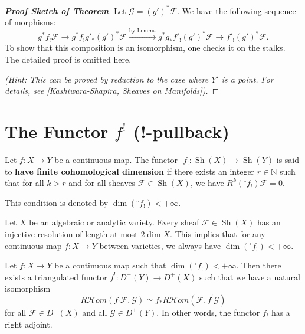 \begin{proof}[\textbf{Proof Sketch of Theorem}]
    Let $\mathcal{G} = (g')^* \mathcal{F}$. We have the following sequence of morphisms:
\begin{equation*}
    g^* f_! \mathcal{F} \longrightarrow g^* f_! g'_* (g')^* \mathcal{F} \xrightarrow{\text{by Lemma}} g^* g_* f'_! (g')^* \mathcal{F} \longrightarrow f'_! (g')^* \mathcal{F}.
\end{equation*}
To show that this composition is an isomorphism, one checks it on the stalks. The detailed proof is omitted here. 

\textit{(Hint: This can be proved by reduction to the case where $Y'$ is a point. For details, see [Kashiwara-Shapira, Sheaves on Manifolds]).}
\end{proof}

\section{The Functor $f^!$ (!-pullback)}

\begin{definition}
Let $f \colon X \to Y$ be a continuous map. The functor $^\circ f_! \colon \operatorname{Sh}(X) \to \operatorname{Sh}(Y)$ is said to \textbf{have finite cohomological dimension} if there exists an integer $r \in \mathbb{N}$ such that for all $k > r$ and for all sheaves $\mathcal{F} \in \operatorname{Sh}(X)$, we have $R^k (^\circ f_!) \mathcal{F} = 0$. 

This condition is denoted by $\dim(^\circ f_!) < +\infty$.
\end{definition}

\begin{example}
Let $X$ be an algebraic or analytic variety. Every sheaf $\mathcal{F} \in \operatorname{Sh}(X)$ has an injective resolution of length at most $2 \dim X$. This implies that for any continuous map $f \colon X \to Y$ between varieties, we always have $\dim(^\circ f_!) < +\infty$.
\end{example}

\begin{theorem}
Let $f \colon X \to Y$ be a continuous map such that $\dim(^\circ f_!) < +\infty$. Then there exists a triangulated functor $f^! \colon D^+(Y) \to D^+(X)$ such that we have a natural isomorphism
\begin{equation*}
    R\mathcal{H}om(f_! \mathcal{F}, \mathcal{G}) \simeq f_* R\mathcal{H}om(\mathcal{F}, f^! \mathcal{G})
\end{equation*}
for all $\mathcal{F} \in D^-(X)$ and all $\mathcal{G} \in D^+(Y)$. In other words, the functor $f_!$ has a right adjoint.
\end{theorem}

